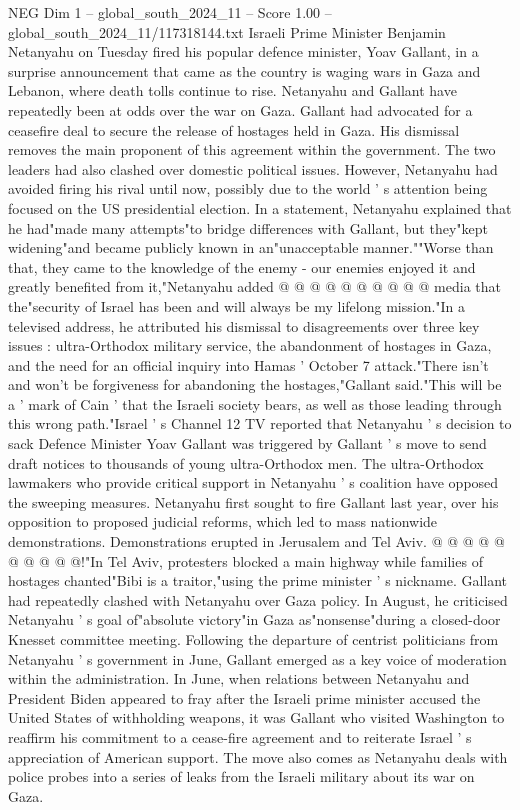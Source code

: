 \begin{textsample}{NEG Dim 1 – global\_south\_2024\_11 – Score 1.00 – global\_south\_2024\_11/117318144.txt}  \label{ex:f1_neg_286}
Israeli Prime Minister Benjamin Netanyahu on Tuesday fired his popular defence minister, Yoav Gallant, in a surprise announcement that came as the country is waging wars in Gaza and Lebanon, where death tolls continue to rise.
Netanyahu and Gallant have repeatedly been at odds over the war on Gaza.
Gallant had advocated for a ceasefire deal to secure the release of hostages held in Gaza.
His dismissal removes the main proponent of this agreement within the government.
The two leaders had also clashed over domestic political issues.
However, Netanyahu had avoided firing his rival until now, possibly due to the world ' s attention being focused on the US presidential election.
In a statement, Netanyahu explained that he had"made many attempts"to bridge differences with Gallant, but they"kept widening"and became publicly known in an"unacceptable manner.""Worse than that, they came to the knowledge of the enemy - our enemies enjoyed it and greatly benefited from it,"Netanyahu added @ @ @ @ @ @ @ @ @ @ media that the"security of Israel has been and will always be my lifelong mission."In a televised address, he attributed his dismissal to disagreements over three key issues : ultra-Orthodox military service, the abandonment of hostages in Gaza, and the need for an official inquiry into Hamas ' October 7 attack."There isn't and won't be forgiveness for abandoning the hostages,"Gallant said."This will be a ' mark of Cain ' that the Israeli society bears, as well as those leading through this wrong path."Israel ' s Channel 12 TV reported that Netanyahu ' s decision to sack Defence Minister Yoav Gallant was triggered by Gallant ' s move to send draft notices to thousands of young ultra-Orthodox men.
The ultra-Orthodox lawmakers who provide critical support in Netanyahu ' s coalition have opposed the sweeping measures.
Netanyahu first sought to fire Gallant last year, over his opposition to proposed judicial reforms, which led to mass nationwide demonstrations.
Demonstrations erupted in Jerusalem and Tel Aviv. @ @ @ @ @ @ @ @ @ @!"In Tel Aviv, protesters blocked a main highway while families of hostages chanted"Bibi is a traitor,"using the prime minister ' s nickname.
Gallant had repeatedly clashed with Netanyahu over Gaza policy.
In August, he criticised Netanyahu ' s goal of"absolute victory"in Gaza as"nonsense"during a closed-door Knesset committee meeting.
Following the departure of centrist politicians from Netanyahu ' s government in June, Gallant emerged as a key voice of moderation within the administration.
In June, when relations between Netanyahu and President Biden appeared to fray after the Israeli prime minister accused the United States of withholding weapons, it was Gallant who visited Washington to reaffirm his commitment to a cease-fire agreement and to reiterate Israel ' s appreciation of American support.
The move also comes as Netanyahu deals with police probes into a series of leaks from the Israeli military about its war on Gaza.

\end{textsample}
